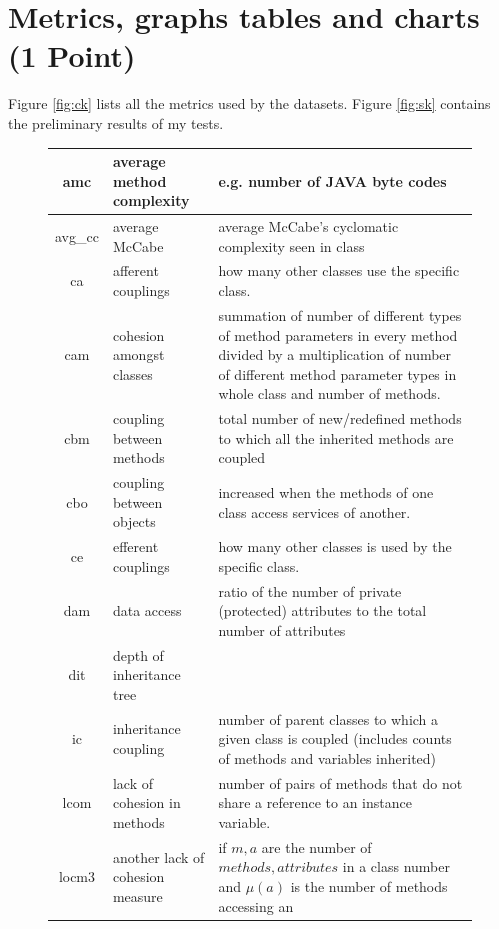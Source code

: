 \documentclass[12pt, journal, onecolumn]{IEEEtran}
\begin{document}
\section{Metrics, graphs tables and charts (1 Point)}
Figure \ref{fig:ck} lists all the metrics used by the datasets. Figure \ref{fig:sk} contains the preliminary results of my tests.
\begin{figure}[h]
  \renewcommand{\baselinestretch}{0.9}\begin{center}
    {\scriptsize
      \begin{tabular}{c|l|p{4.7in}}
        amc & average method complexity & e.g. number of JAVA byte codes\\\hline
        avg\_cc & average McCabe & average McCabe's cyclomatic complexity seen
        in class\\\hline
        ca & afferent couplings & how many other classes use the specific
        class. \\\hline
        cam & cohesion amongst classes & summation of number of different
        types of method parameters in every method divided by a multiplication
        of number of different method parameter types in whole class and
        number of methods. \\\hline
        cbm &coupling between methods &  total number of new/redefined methods
        to which all the inherited methods are coupled\\\hline
        cbo & coupling between objects & increased when the methods of one
        class access services of another.\\\hline
        ce & efferent couplings & how many other classes is used by the
        specific class. \\\hline
        dam & data access & ratio of the number of private (protected)
        attributes to the total number of attributes\\\hline
        dit & depth of inheritance tree &\\\hline
        ic & inheritance coupling &  number of parent classes to which a given
        class is coupled (includes counts of methods and variables inherited)
        \\\hline
        lcom & lack of cohesion in methods &number of pairs of methods that do
        not share a reference to an instance variable.\\\hline
        locm3 & another lack of cohesion measure & if $m,a$ are  the number of
        $methods,attributes$
        in a class number and $\mu(a)$  is the number of methods accessing an

\end{tabular}}
\end{center}
\end{figure}
\end{document}
